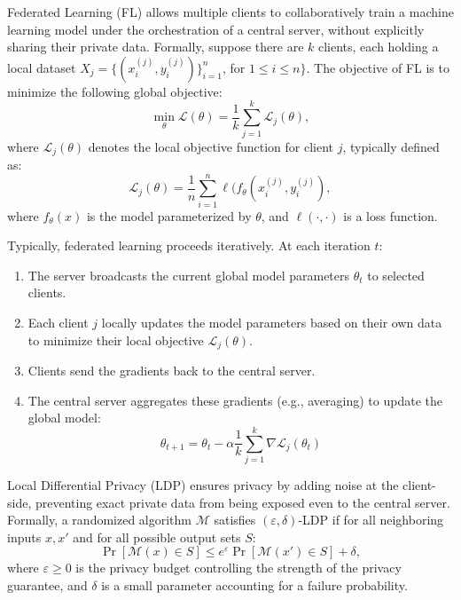 \documentclass[11pt, a4paper]{article}
\begin{document}
Federated Learning (FL) allows multiple clients to collaboratively train a machine learning model 
under the orchestration of a central server, without explicitly sharing their private data.
Formally, suppose there are $k$ clients, each holding a local dataset
$X_j = \{(x^{(j)}_i, y^{(j)}_i)\}_{i=1}^{n}$, for $1\leq i\leq n\}$.
The objective of FL is to minimize the following global objective:
\begin{equation}
\min_{\theta} \mathcal{L}(\theta) = \frac{1}{k}\sum_{j=1}^{k}  \mathcal{L}_j(\theta),
\end{equation}
where $\mathcal{L}_j(\theta)$ denotes the local objective function for client $j$, typically defined as:
\begin{equation}
\mathcal{L}_j(\theta) = \frac{1}{n}\sum_{i=1}^n \ell(f_{\theta}(x^{(j)}_i, y^{(j)}_i),
\end{equation}
where $f_{\theta}(x)$ is the model parameterized by $\theta$, and $\ell(\cdot,\cdot)$ is a loss function.


Typically, federated learning proceeds iteratively.
At each iteration $t$:
\begin{enumerate}
    \item The server broadcasts the current global model parameters $\theta_t$ to selected clients.
    \item Each client $j$ locally updates the model parameters based on their own data 
         to minimize their local objective $\mathcal{L}_j(\theta)$.
    \item Clients send the gradients back to the central server.
    \item The central server aggregates these gradients (e.g., averaging) to update the global model:
    \begin{equation}
        \theta_{t+1} = \theta_t - \alpha \frac{1}{k}\sum_{j=1}^{k} \nabla \mathcal{L}_j(\theta_t)
    \end{equation}
\end{enumerate}

Local Differential Privacy (LDP) ensures privacy by adding noise at the client-side,
preventing exact private data from being exposed even to the central server.
Formally, a randomized algorithm $\mathcal{M}$ satisfies $(\varepsilon, \delta)$-LDP if for all neighboring inputs $x, x'$
and for all possible output sets $S$:
\begin{equation}
\Pr[\mathcal{M}(x) \in S] \leq e^{\varepsilon} \Pr[\mathcal{M}(x') \in S] + \delta,
\end{equation}
where $\varepsilon \geq 0$ is the privacy budget controlling the strength of the privacy guarantee,
and $\delta$ is a small parameter accounting for a failure probability.
\end{document}
